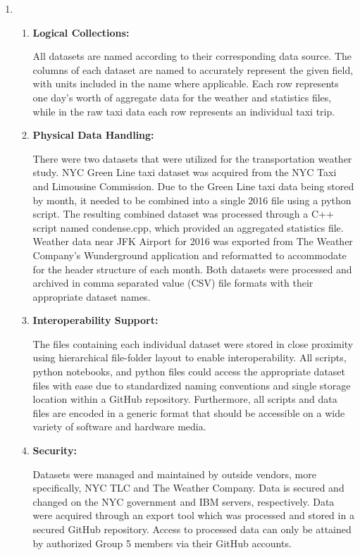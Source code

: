 \documentclass{article}
\begin{document}
\begin{enumerate}
\begin{enumerate}
    \end{enumerate}

    \item %

    \begin{enumerate}

        \item
        \textbf{Logical Collections:}

        All datasets are named according to their corresponding data source. The columns of each dataset are named to accurately represent the given field, with units included in the name where applicable. Each row represents one day's worth of aggregate data for the weather and statistics files, while in the raw taxi data each row represents an individual taxi trip.


        \item
        \textbf{Physical Data Handling:}

        There were two datasets that were utilized for the transportation weather study. NYC Green Line taxi dataset was acquired from the NYC Taxi and Limousine Commission. Due to the Green Line taxi data being stored by month, it needed to be combined into a single 2016 file using a python script. The resulting combined dataset was processed through a C++ script named condense.cpp, which provided an aggregated statistics file. Weather data near JFK Airport for 2016 was exported from The Weather Company’s Wunderground application and reformatted to accommodate for the header structure of each month. Both datasets were processed and archived in comma separated value (CSV) file formats with their appropriate dataset names.


        \item
        \textbf{Interoperability Support:}

        The files containing each individual dataset were stored in close proximity using hierarchical file-folder layout to enable interoperability. All scripts, python notebooks, and python files could access the appropriate dataset files with ease due to standardized naming conventions and single storage location within a GitHub repository. Furthermore, all scripts and data files are encoded in a generic format that should be accessible on a wide variety of software and hardware media.


        \item
        \textbf{Security:}

        Datasets were managed and maintained by outside vendors, more specifically, NYC TLC and The Weather Company. Data is secured and changed on the NYC government and IBM servers, respectively. Data were acquired through an export tool which was processed and stored in a secured GitHub repository. Access to processed data can only be attained by authorized Group 5 members via their GitHub accounts.



\end{enumerate}
\end{enumerate}
\end{document}
